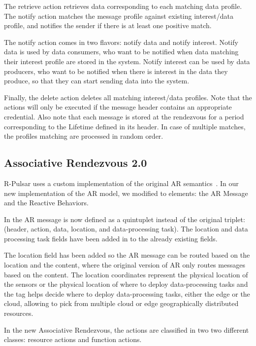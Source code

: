 The retrieve action retrieves data corresponding to each matching data profile. The notify action
matches the message profile against existing interest/data profile, and notifies the sender if there
is at least one positive match. 

The notify action comes in two flavors: notify data and notify interest.
Notify data is used by data consumers, who want to be notified when data matching their interest
profile are stored in the system. Notify interest can be used by data producers, who want to be notified
when there is interest in the data they produce, so that they can start sending data into the system.

Finally, the delete action deletes all matching interest/data profiles. Note that the actions will
only be executed if the message header contains an appropriate credential. Also note that each
message is stored at the rendezvous for a period corresponding to the Lifetime defined in its header.
In case of multiple matches, the profiles matching are processed in random order.

\subsection{Associative Rendezvous 2.0}\label{sec:semantics}
R-Pulsar uses a custom implementation of the original AR semantics~\cite{meteor2008}. In our new implementation of the AR model, we modified to elements: the AR Message and the Reactive Behaviors.

In the AR message is now defined as a quintuplet instead of the original triplet: (header, action, data, location, and data-processing task). The location and data processing task fields have been added in to the already existing fields.

The location field has been added so the AR message can be routed based on the location and the content, where the original version of AR only routes messages based on the content. The location coordinates represent the physical location of the sensors or the physical location of where to deploy data-processing tasks and the tag helps decide where to deploy data-processing tasks, either the edge or the cloud, allowing to pick from multiple cloud or edge geographically distributed resources. 

In the new Associative Rendezvous, the actions are classified in two two different classes: resource actions and function actions. 

